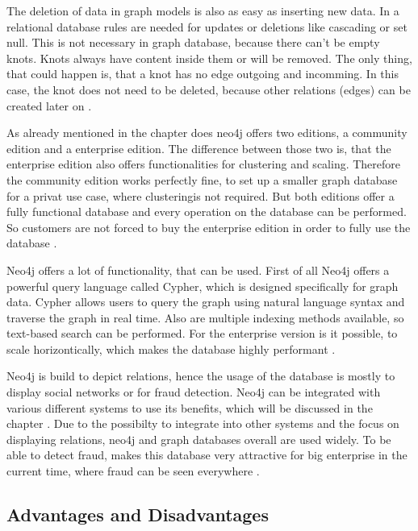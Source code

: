 The deletion of data in graph models is also as easy as inserting new data. In a relational database rules are needed for updates or deletions like cascading or set null. This is not necessary in graph database, because there can't be empty knots. Knots always have content inside them or will be removed. The only thing, that could happen is, that a knot has no edge outgoing and incomming. In this case, the knot
does not need to be deleted, because other relations (edges) can be created later on \parencite{graphmodelneo4j} \parencite{funcneo4j}.

As already mentioned in the chapter  does neo4j offers two editions, a community edition and a enterprise edition. The difference between those two is, that the enterprise edition also offers functionalities for clustering and scaling. Therefore the community edition works perfectly fine, to set up a smaller
graph database for a privat use case, where clusteringis not required. But both editions offer a fully functional database and every operation on the database can be performed. So customers are not forced to buy the enterprise edition in order to fully use the database \parencite{Neo4jfeatures}.

Neo4j offers a lot of functionality, that can be used. First of all Neo4j offers a powerful query language called Cypher, which is designed specifically for graph data. Cypher allows users to query the graph using natural language syntax and traverse the graph in real time. Also are multiple indexing methods available, so text-based search can be performed.
For the enterprise version is it possible, to scale horizontically, which makes the database highly performant \parencite{Neo4jfeatures}.

Neo4j is build to depict relations, hence the usage of the database is mostly to display social networks or for fraud detection. Neo4j can be integrated with various different systems to use its benefits, which will be discussed in the chapter . Due to the possibilty to integrate into other systems and the focus on displaying relations, neo4j and graph databases overall
are used widely. To be able to detect fraud, makes this database very attractive for big enterprise in the current time, where fraud can be seen everywhere \parencite{Neo4jfeatures}.
\subsection{Advantages and Disadvantages} \label{subsec:advantagesDisadvantagesNeo4j}

